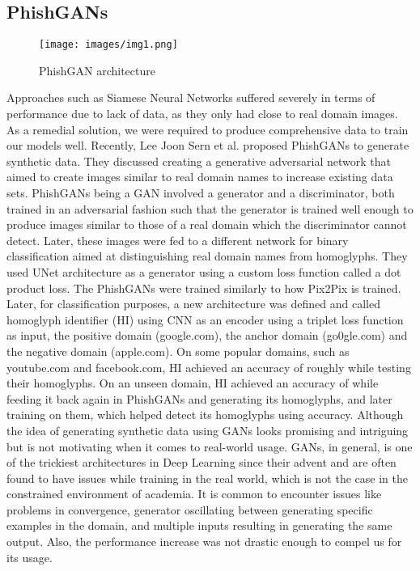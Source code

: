 \documentclass[letterpaper]{article} \usepackage{aaai22}  \usepackage{times}  \usepackage{helvet}  \usepackage{courier}  \usepackage[hyphens]{url}  \usepackage{graphicx} \urlstyle{rm} \def\UrlFont{\rm}  \usepackage{natbib}  \usepackage{caption} \DeclareCaptionStyle{ruled}{labelfont=normalfont,labelsep=colon,strut=off} \frenchspacing  \setlength{\pdfpagewidth}{8.5in}  \setlength{\pdfpageheight}{11in}  \usepackage{algorithm}
\begin{document}
\subsection{PhishGANs}
\begin{figure}
    \texttt{[image: images/img1.png]}
	\caption{PhishGAN architecture\cite{sern2020phishgan}}
	\label{fig4}
\end{figure}

Approaches such as Siamese Neural Networks suffered severely in terms of performance due to lack of data, as they only had close to  real domain images. As a remedial solution, we were required to produce comprehensive data to train our models well. Recently, Lee Joon Sern et al. proposed PhishGANs to generate synthetic data\cite{sern2020phishgan}. They discussed creating a generative adversarial network\cite{goodfellow2014generative} that aimed to create images similar to real domain names to increase existing data sets. PhishGANs\cite{sern2020phishgan} being a GAN\cite{goodfellow2014generative} involved a generator and a discriminator, both trained in an adversarial fashion such that the generator is trained well enough to produce images similar to those of a real domain which the discriminator cannot detect. Later, these images were fed to a different network for binary classification aimed at distinguishing real domain names from homoglyphs. They used UNet\cite{ronneberger2015u} architecture as a generator using a custom loss function called a dot product loss. The PhishGANs\cite{sern2020phishgan} were trained similarly to how Pix2Pix\cite{isola2017image} is trained. Later, for classification purposes, a new architecture was defined and called homoglyph identifier (HI) using CNN\cite{lecun1995convolutional} as an encoder using a triplet loss function \cite{hoffer2015deep} as input, the positive domain (google.com), the anchor domain (go0gle.com) and the negative domain (apple.com). On some popular domains, such as youtube.com and facebook.com, HI achieved an accuracy of roughly  while testing their homoglyphs. On an unseen domain, HI achieved an accuracy of  while feeding it back again in PhishGANs\cite{sern2020phishgan} and generating its homoglyphs, and later training on them, which helped detect its homoglyphs using  accuracy. Although the idea of generating synthetic data using GANs\cite{goodfellow2014generative} looks promising and intriguing but is not motivating when it comes to real-world usage. GANs\cite{goodfellow2014generative}, in general, is one of the trickiest architectures in Deep Learning\cite{lecun2015deep} since their advent and are often found to have issues while training in the real world, which is not the case in the constrained environment of academia. It is common to encounter issues like problems in convergence, generator oscillating between generating specific examples in the domain, and multiple inputs resulting in generating the same output. Also, the performance increase was not drastic enough to compel us for its usage. 
\end{document}
